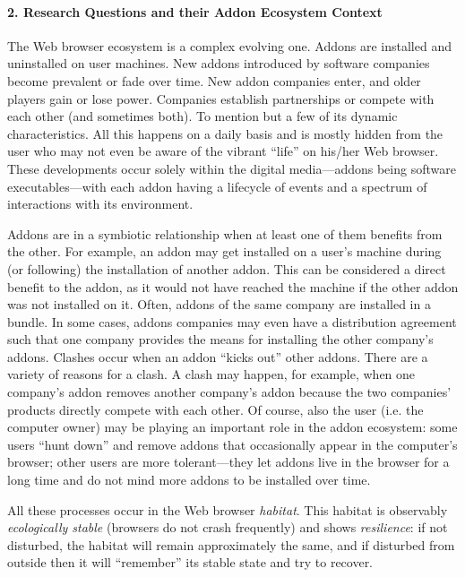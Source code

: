 \documentclass{article} %
\begin{document}
\paragraph{2.  Research Questions and their Addon Ecosystem Context}



The Web browser ecosystem is a complex evolving one. Addons are installed and uninstalled on user machines. New addons introduced by software companies become prevalent or fade over time. New addon companies enter, and older players gain or lose power. Companies establish partnerships or compete with each other (and sometimes both). To mention but a few of its dynamic characteristics. All this happens on a daily basis and is mostly hidden from the user who may not even be aware of the vibrant ``life'' on his/her Web browser. These developments occur solely within the digital media---addons being software executables---with each addon having a lifecycle of events and a spectrum of interactions with its environment. 

Addons are in a symbiotic relationship when at least one of them benefits from the other. For example, an addon may get installed on a user's machine during (or following) the installation of another addon. This can be considered a direct benefit to the addon, as it would not have reached the machine if the other addon was not installed on it. Often, addons of the same company are installed in a bundle. In some cases, addons companies may even have a distribution agreement such that one company provides the means for installing the other company's addons. Clashes occur when an addon ``kicks out'' other addons. There are a variety of reasons for a clash. A clash may happen, for example, when one company's addon removes another company's addon because the two companies' products directly compete with each other. Of course, also the user (i.e. the computer owner) may be playing an important role in the addon ecosystem: some users ``hunt down'' and remove addons that occasionally appear in the computer's browser; other users are more tolerant---they let addons live in the browser for a long time and do not mind more addons to be installed over time. 

All these processes occur in the Web browser \textit{habitat}. This habitat is observably \textit{ecologically stable} (browsers do not crash frequently) and shows \textit{resilience}: if not disturbed, the habitat will remain approximately the same, and if disturbed from outside then it will ``remember'' its stable state and try to recover. 
\end{document}
